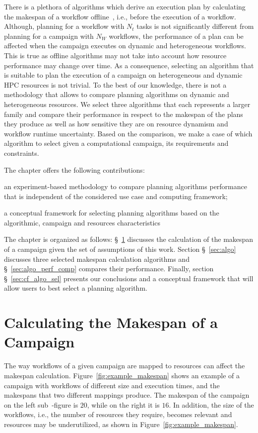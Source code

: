 There is a plethora of algorithms which derive an execution plan by calculating the makespan of a workflow offline~\cite{lu2019review}, i.e., before the execution of a workflow.
Although, planning for a workflow with $N_t$ tasks is not significantly different from planning for a campaign with $N_W$ workflows, the performance of a plan can be affected when the campaign executes on dynamic and heterogeneous workflows.
This is true as offline algorithms may not take into account how resource performance may change over time. 
As a consequence, selecting an algorithm that is suitable to plan the execution of a campaign on heterogeneous and dynamic HPC resources is not trivial.
To the best of our knowledge, there is not a methodology that allows to compare planning algorithms on dynamic and heterogeneous resources.
We select three algorithms that each represents a larger family and compare their performance in respect to the makespan of the plans they produce as well as how sensitive they are on resource dynamism and workflow runtime uncertainty.
Based on the comparison, we make a case of which algorithm to select given a computational campaign, its requirements and constraints.

The chapter offers the following contributions:
\begin{inparaenum}[i)]
    \item an experiment-based methodology to compare planning algorithms performance that is independent of the considered use case and computing framework;
    \item a conceptual framework for selecting planning algorithms based on the algorithmic, campaign and resources characteristics
\end{inparaenum}

The chapter is organized as follows: \S~\ref{sec:makespan_calc} discusses the calculation of the makespan of a campaign given the set of assumptions of this work.
Section \S~\ref{sec:algo} discusses three selected makespan calculation algorithms and \S~\ref{sec:algo_perf_comp} compares their performance.
Finally, section \S~\ref{sec:cf_algo_sel} presents our conclusions and a conceptual framework that will allow users to best select a planning algorithm.

\section{Calculating the Makespan of a Campaign}
\label{sec:makespan_calc}
The way workflows of a given campaign are mapped to resources can affect the makespan calculation. 
Figure~\ref{fig:example_makespan} shows an example of a campaign with workflows of different size and execution times, and the makespans that two different mappings produce.
The makespan of the campaign on the left sub~-figure is $20$, while on the right it is $16$.
In addition, the size of the workflows, i.e., the number of resources they require, becomes relevant and resources may be underutilized, as shown in Figure~\ref{fig:example_makespan}.

